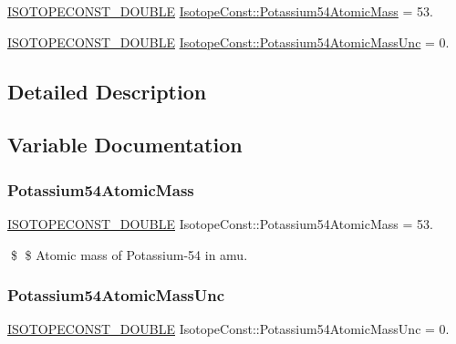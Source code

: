 \begin{DoxyCompactItemize}
\item 
\mbox{\hyperlink{group___isotope_const-_macros_ga8f45a7272ce02c0b4c65c44636ed719a}{I\+S\+O\+T\+O\+P\+E\+C\+O\+N\+S\+T\+\_\+\+D\+O\+U\+B\+LE}} \mbox{\hyperlink{group___isotope_const-_potassium-_k54_ga8fe386961e40963856c54b7fbd611f42}{Isotope\+Const\+::\+Potassium54\+Atomic\+Mass}} = 53.
\item 
\mbox{\hyperlink{group___isotope_const-_macros_ga8f45a7272ce02c0b4c65c44636ed719a}{I\+S\+O\+T\+O\+P\+E\+C\+O\+N\+S\+T\+\_\+\+D\+O\+U\+B\+LE}} \mbox{\hyperlink{group___isotope_const-_potassium-_k54_gaa19b88ab96b641aa9d2a1b951ac72172}{Isotope\+Const\+::\+Potassium54\+Atomic\+Mass\+Unc}} = 0.
\end{DoxyCompactItemize}


\subsection{Detailed Description}


\subsection{Variable Documentation}
\mbox{\label{group___isotope_const-_potassium-_k54_ga8fe386961e40963856c54b7fbd611f42}} 
\subsubsection{\texorpdfstring{Potassium54\+Atomic\+Mass}{Potassium54AtomicMass}}
{\footnotesize\ttfamily \mbox{\hyperlink{group___isotope_const-_macros_ga8f45a7272ce02c0b4c65c44636ed719a}{I\+S\+O\+T\+O\+P\+E\+C\+O\+N\+S\+T\+\_\+\+D\+O\+U\+B\+LE}} Isotope\+Const\+::\+Potassium54\+Atomic\+Mass = 53.}

\$ \$ Atomic mass of Potassium-\/54 in amu. \mbox{\label{group___isotope_const-_potassium-_k54_gaa19b88ab96b641aa9d2a1b951ac72172}} 
\subsubsection{\texorpdfstring{Potassium54\+Atomic\+Mass\+Unc}{Potassium54AtomicMassUnc}}
{\footnotesize\ttfamily \mbox{\hyperlink{group___isotope_const-_macros_ga8f45a7272ce02c0b4c65c44636ed719a}{I\+S\+O\+T\+O\+P\+E\+C\+O\+N\+S\+T\+\_\+\+D\+O\+U\+B\+LE}} Isotope\+Const\+::\+Potassium54\+Atomic\+Mass\+Unc = 0.}

